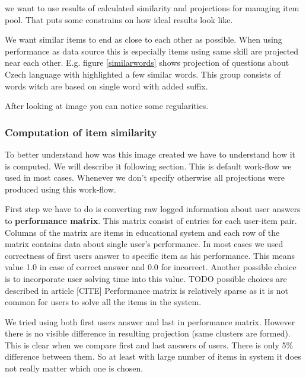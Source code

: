 \documentclass[
  digital, %
  table,   %
  nolof,     %
  nolot,     %
  nocover
]{fithesis3}
\begin{document}
we want to use results of calculated similarity and projections for
managing item pool. That puts some constrains on how ideal results look
like.

We want similar items to end as close to each other as possible. When
using performance as data source this is especially items using same
skill are projected near each other. E.g. figure \ref{similarwords}
shows projection of questions about Czech language with highlighted a
few similar words. This group consists of words witch are based on
single word with added suffix.



After looking at image you can notice some regularities.

\subsubsection{Computation of item
similarity}\label{computation-of-item-similarity}


To better understand how was this image created we have to understand
how it is computed. We will describe it following section. This is
default work-flow we used in most cases. Whenever we don't specify
otherwise all projections were produced using this work-flow.


First step we have to do is converting raw logged information about
user answers to \textbf{performance matrix}. This matrix consist of entries for
each user-item pair. Columns of the matrix are items in educational
system and each row of the matrix contains data about single user's
performance. In most cases we used correctness of first users answer
to specific item as his performance. This means value 1.0 in case of
correct answer and 0.0 for incorrect. Another possible choice is to
incorporate user solving time into this value. TODO possible choices
are described in article [CITE] Performance matrix is relatively
sparse as it is not common for users to solve all the items in the
system.

We tried using both first users answer and last in performance matrix.
However there is no visible difference in resulting projection (same
clusters are formed). This is clear when we compare first and last
answers of users. There is only 5\% difference between them. So at least
with large number of items in system it does not really matter which one
is chosen.
\end{document}
